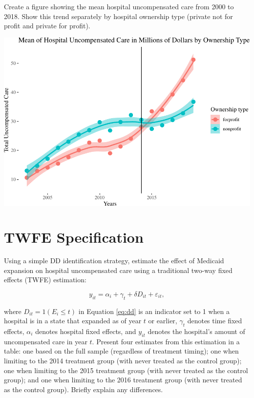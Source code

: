 \documentclass[
  12pt,
]{article}
\begin{document}
Create a figure showing the mean hospital uncompensated care from 2000
to 2018. Show this trend separately by hospital ownership type (private
not for profit and private for profit).

\includegraphics{Report_files/figure-latex/Fig-2-1.pdf}

\hypertarget{twfe-specification}{%
\section{TWFE Specification}\label{twfe-specification}}

Using a simple DD identification strategy, estimate the effect of
Medicaid expansion on hospital uncompensated care using a traditional
two-way fixed effects (TWFE) estimation:

\begin{equation}\label{eq:dd}
y_{it} = \alpha_{i} + \gamma_{t} + \delta D_{it} + \varepsilon_{it},
\end{equation}

where \(D_{it}=1(E_{i}\leq t)\) in Equation \ref{eq:dd} is an indicator
set to 1 when a hospital is in a state that expanded as of year \(t\) or
earlier, \(\gamma_{t}\) denotes time fixed effects, \(\alpha_{i}\)
denotes hospital fixed effects, and \(y_{it}\) denotes the hospital's
amount of uncompensated care in year \(t\). Present four estimates from
this estimation in a table: one based on the full sample (regardless of
treatment timing); one when limiting to the 2014 treatment group (with
never treated as the control group); one when limiting to the 2015
treatment group (with never treated as the control group); and one when
limiting to the 2016 treatment group (with never treated as the control
group). Briefly explain any differences.
\end{document}

